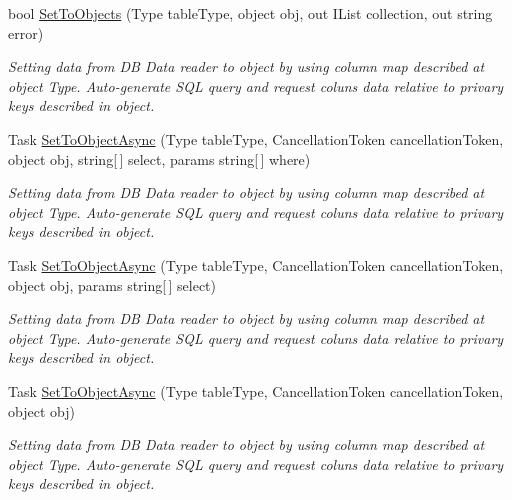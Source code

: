 \begin{DoxyCompactItemize}
bool \mbox{\hyperlink{interface_uniform_data_operator_1_1_sql_1_1_i_sql_operator_a6bde25bff76c7b2105aa4e14740eb07d}{Set\+To\+Objects}} (Type table\+Type, object obj, out I\+List collection, out string error)
\begin{DoxyCompactList}\small\item\em Setting data from DB Data reader to object by using column map described at object Type. Auto-\/generate S\+QL query and request coluns data relative to privary keys described in object. \end{DoxyCompactList}\item 
Task \mbox{\hyperlink{interface_uniform_data_operator_1_1_sql_1_1_i_sql_operator_a16e1513f43f3b9d76c687ba3b026573d}{Set\+To\+Object\+Async}} (Type table\+Type, Cancellation\+Token cancellation\+Token, object obj, string\mbox{[}$\,$\mbox{]} select, params string\mbox{[}$\,$\mbox{]} where)
\begin{DoxyCompactList}\small\item\em Setting data from DB Data reader to object by using column map described at object Type. Auto-\/generate S\+QL query and request coluns data relative to privary keys described in object. \end{DoxyCompactList}\item 
Task \mbox{\hyperlink{interface_uniform_data_operator_1_1_sql_1_1_i_sql_operator_a3a973b49f190dabe6bcd0bf3e79b3c5e}{Set\+To\+Object\+Async}} (Type table\+Type, Cancellation\+Token cancellation\+Token, object obj, params string\mbox{[}$\,$\mbox{]} select)
\begin{DoxyCompactList}\small\item\em Setting data from DB Data reader to object by using column map described at object Type. Auto-\/generate S\+QL query and request coluns data relative to privary keys described in object. \end{DoxyCompactList}\item 
Task \mbox{\hyperlink{interface_uniform_data_operator_1_1_sql_1_1_i_sql_operator_a497325acf359d4f8444ee0c2ff858e6e}{Set\+To\+Object\+Async}} (Type table\+Type, Cancellation\+Token cancellation\+Token, object obj)
\begin{DoxyCompactList}\small\item\em Setting data from DB Data reader to object by using column map described at object Type. Auto-\/generate S\+QL query and request coluns data relative to privary keys described in object. \end{DoxyCompactList}\item 

\end{DoxyCompactItemize}
